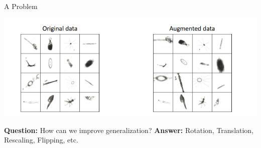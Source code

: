 \documentclass[serif, aspectratio=169]{beamer}
\begin{document}
	\begin{frame}{A Problem}
		
		\centering
		\includegraphics[keepaspectratio, scale=0.6]{pic/training7.png}
		\smallskip
		
	
		
		\begin{flushleft}
			\textbf{Question:} How can we improve generalization?
			\bigskip
			\textbf{Answer:} Rotation, Translation, Rescaling, Flipping, etc.
			
		\end{flushleft}
		
	\end{frame}
\end{document}
